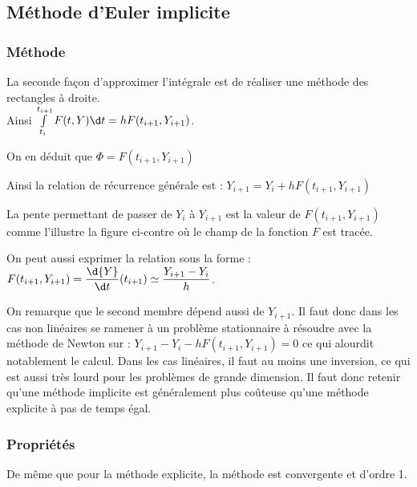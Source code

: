 \documentclass[10pt]{article}
\begin{document}
\noindent\begin{minipage}{10cm}
\subsection{Méthode d'Euler implicite}
\subsubsection{Méthode}
La seconde façon d'approximer l'intégrale est de réaliser une méthode des rectangles à droite. \\
Ainsi $\int\limits_{t_i}^{t_{i+1}}   {F}(t,  {Y})\d t = h   {F}(t_{i+1},  {Y}_{i+1})$.
\end{minipage}


On en déduit que $  {\Phi} =   {F}(t_{i+1},  {Y}_{i+1}) $

Ainsi la relation de récurrence générale est : $  {Y}_{i+1} =   {Y}_{i} + h  {F}(t_{i+1},  {Y}_{i+1})$

La pente permettant de passer de $  {Y}_{i}$ à $  {Y}_{i+1}$ est la valeur de $  {F}(t_{i+1},  {Y}_{i+1})$ comme l'illustre la figure ci-contre où le champ de la fonction $  {F}$ est tracée.


On peut aussi exprimer la relation sous la forme : $  {F}(t_{i+1},  {Y}_{i+1})=\dfrac{\d  {Y}}{\d t}(t_{i+1}) \simeq \dfrac{  {Y}_{i+1}-  {Y}_i}{h}$.  



On remarque que le second membre dépend aussi de $  {Y}_{i+1}$. Il faut donc dans les cas non linéaires se ramener à un problème stationnaire à résoudre avec la méthode de Newton sur :
$  {Y}_{i+1} -   {Y}_{i} - h  {F}(t_{i+1},  {Y}_{i+1}) = 0$ ce qui alourdit notablement le calcul. Dans les cas linéaires, il faut au moins une inversion, ce qui est aussi très lourd pour les problèmes de grande dimension. Il faut donc retenir qu'une méthode implicite est généralement plus coûteuse qu'une méthode explicite à pas de temps égal.

\subsubsection{Propriétés}
De même que pour la méthode explicite, la méthode est convergente et d'ordre 1.
\end{document}
